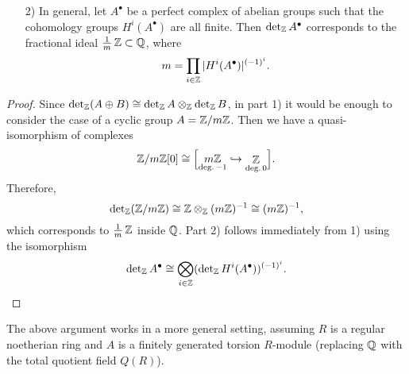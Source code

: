 \documentclass{article}
\numberwithin{equation}{section}
\begin{document}
\begin{appendices}
\begin{lemma}
\begin{enumerate}
  \item[2)] In general, let $A^\bullet$ be a perfect complex of abelian groups
    such that the cohomology groups $H^i (A^\bullet)$ are all finite. Then
    $\operatorname{det}_{\mathbb{Z}} A^\bullet$ corresponds to the fractional ideal
    $\frac{1}{m}\,\mathbb{Z} \subset \mathbb{Q}$, where
    $$m = \prod_{i\in \mathbb{Z}} |H^i (A^\bullet)|^{(-1)^i}.$$
  \end{enumerate}

  \begin{proof}
    Since $\operatorname{det}_{\mathbb{Z}} (A\oplus B) \cong \operatorname{det}_{\mathbb{Z}} A \otimes_{\mathbb{Z}} \operatorname{det}_{\mathbb{Z}} B$, in
    part 1) it would be enough to consider the case of a cyclic group
    $A = \mathbb{Z}/m\mathbb{Z}$. Then we have a quasi-isomorphism of complexes
    \[ \mathbb{Z}/m\mathbb{Z} [0] \cong \Bigl[
      \mathop{m\mathbb{Z}}_{\text{deg.\,}-1} \hookrightarrow
      \mathop{\mathbb{Z}}_{\text{deg.\,}0}
      \Bigr]. \]
    Therefore,
    $$\operatorname{det}_{\mathbb{Z}} (\mathbb{Z}/m\mathbb{Z}) \cong \mathbb{Z} \otimes_{\mathbb{Z}} (m\mathbb{Z})^{-1} \cong (m\mathbb{Z})^{-1},$$
    which corresponds to $\frac{1}{m}\,\mathbb{Z}$ inside $\mathbb{Q}$.
    Part 2) follows immediately from 1) using the isomorphism
    \[ \operatorname{det}_{\mathbb{Z}} A^\bullet \cong
      \bigotimes_{i\in \mathbb{Z}} (\operatorname{det}_{\mathbb{Z}} H^i (A^\bullet))^{(-1)^i}. \qedhere \]
  \end{proof}
\end{lemma}

\begin{remark}
  The above argument works in a more general setting, assuming $R$ is a regular
  noetherian ring and $A$ is a finitely generated torsion $R$-module (replacing
  $\mathbb{Q}$ with the total quotient field $Q (R)$).
\end{remark}

\end{appendices}


\pagebreak


\end{document}
